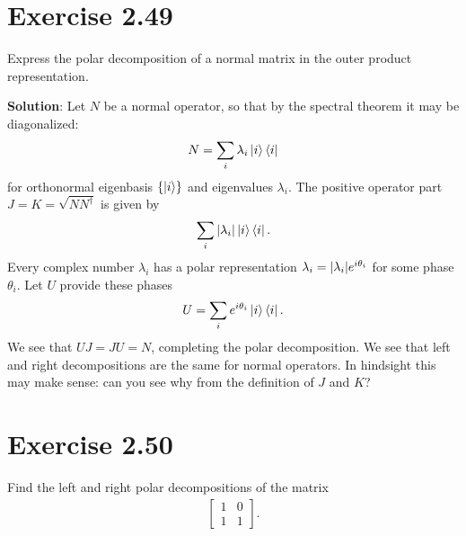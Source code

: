\documentclass{book}
\begin{document}
\section*{Exercise 2.49}
    Express the polar decomposition of a normal matrix in the outer product representation.
    
    \textbf{Solution}: Let $N$ be a normal operator, so that by the spectral theorem it may be diagonalized: 
    \begin{align}
        N = \sum_i \lambda_i \ket{i}\bra{i}
    \end{align}
    for orthonormal eigenbasis $\{\ket{i}\}$ and eigenvalues $\lambda_i$. The positive operator part $J = K = \sqrt{N N^\dagger}$ is given by 
    \begin{align}
        \sum_{i} \abs{\lambda_i} \ket{i}\bra{i}.
    \end{align}
    Every complex number $\lambda_i$ has a polar representation $\lambda_i = \abs{\lambda_i} e^{i\theta_i}$ for some phase $\theta_i$. Let $U$ provide these phases
    \begin{align}
        U = \sum_i e^{i\theta_i} \ket{i}\bra{i}.
    \end{align}
    We see that $UJ = JU = N$, completing the polar decomposition. We see that left and right decompositions are the same for normal operators. In hindsight this may make sense: can you see why from the definition of $J$ and $K$?
    
\section*{Exercise 2.50}
    Find the left and right polar decompositions of the matrix
    \begin{align}
        \begin{bmatrix}
            1 & 0 \\
            1 & 1
        \end{bmatrix}.
    \end{align}
    
\end{document}
